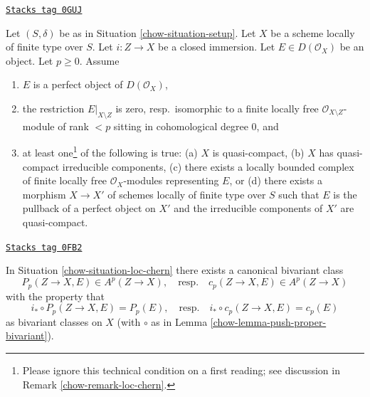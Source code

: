 \begin{definition}
\label{chow-situation-loc-chern}
\href{https://stacks.math.columbia.edu/tag/0GUJ}{\texttt{Stacks tag 0GUJ}}

Let $(S, \delta)$ be as in Situation \ref{chow-situation-setup}. Let $X$ be a scheme
locally of finite type over $S$. Let $i : Z \to X$ be a closed immersion.
Let $E \in D(\mathcal{O}_X)$ be an object. Let $p \geq 0$. Assume
\begin{enumerate}
\item $E$ is a perfect object of $D(\mathcal{O}_X)$,
\item the restriction $E|_{X \setminus Z}$ is zero, resp.\ isomorphic to a
finite locally free $\mathcal{O}_{X \setminus Z}$-module of rank $< p$
sitting in cohomological degree $0$, and
\item at least one\footnote{Please ignore this technical condition on a
first reading; see discussion in Remark \ref{chow-remark-loc-chern}.}
of the following is true:
(a) $X$ is quasi-compact,
(b) $X$ has quasi-compact irreducible components,
(c) there exists a locally bounded complex of finite locally free
$\mathcal{O}_X$-modules representing $E$, or
(d) there exists a morphism $X \to X'$ of schemes locally of finite type
over $S$ such that $E$ is the pullback of a perfect object on $X'$ and
the irreducible components of $X'$ are quasi-compact.
\end{enumerate}
\end{definition}

\begin{lemma}
\label{chow-lemma-independent-loc-chern}
\href{https://stacks.math.columbia.edu/tag/0FB2}{\texttt{Stacks tag 0FB2}}

In Situation \ref{chow-situation-loc-chern} there exists a canonical bivariant class
$$
P_p(Z \to X, E) \in A^p(Z \to X),
\quad\text{resp.}\quad
c_p(Z \to X, E) \in A^p(Z \to X)
$$
with the property that
\begin{equation}
\label{equation-defining-property-localized-classes}
i_* \circ P_p(Z \to X, E) = P_p(E),
\quad\text{resp.}\quad
i_* \circ c_p(Z \to X, E) = c_p(E)
\end{equation}
as bivariant classes on $X$ (with $\circ$ as in
Lemma \ref{chow-lemma-push-proper-bivariant}).
\end{lemma}

